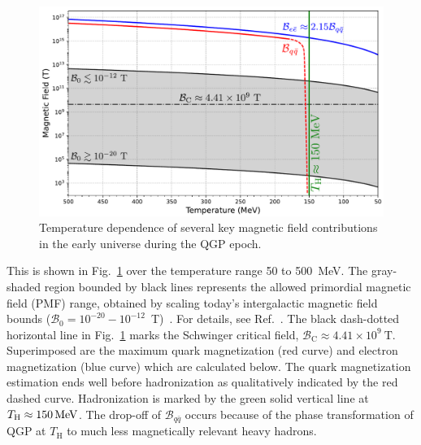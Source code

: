 \documentclass[epjST]{svjour}
\newcommand*{\MeV}{\text{\,MeV}}
\begin{document}
\begin{figure}%
\centerline{
\includegraphics[width=0.90\columnwidth]{Figure_1.pdf}}
\caption{\label{Figure_1}Temperature dependence of several key magnetic field contributions in the early universe during the QGP epoch.}
\end{figure}

This is shown in Fig.~\ref{Figure_1} over the temperature range 50 to 500~MeV. The gray-shaded region bounded by black lines represents the allowed primordial magnetic field (PMF) range, obtained by scaling today’s intergalactic magnetic field bounds (\(\mathcal{B}_{0} = 10^{-20}-10^{-12}\)~T)~\cite{Planck:2015zrl,Jedamzik:2018itu}. For details, see Ref.~\cite{Steinmetz:2023nsc}. The black dash-dotted horizontal line in Fig.~\ref{Figure_1} marks the Schwinger critical field, \(\mathcal{B}_\mathrm{C}\approx4.41\times10^{9}~\mathrm{T}\). Superimposed are the maximum quark magnetization (red curve) and electron magnetization (blue curve) which are calculated below. The quark magnetization estimation ends well before hadronization as qualitatively indicated by the red dashed curve. Hadronization is marked by the green solid vertical line at \(T_\mathrm{H}\approx150\MeV\). The drop-off of \(\mathcal{B}_{q\bar{q}}\) occurs because of the phase transformation of QGP at \(T_\mathrm{H}\) to much less magnetically relevant heavy hadrons.
\end{document}
